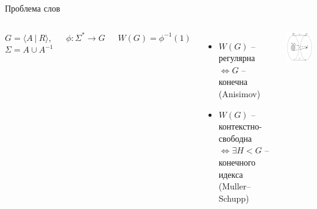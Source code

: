 \documentclass[xcolor=table]{beamer}
\begin{document}
\begin{frame}[noframenumbering]{Проблема слов}
    \begin{columns}[onlytextwidth,T]
        \column{\dimexpr\linewidth-60mm-5mm}
        $G = \langle A~|~R \rangle$, $\Sigma = A \cup A^{-1}$
        
        $\phi : \Sigma^* \to G$
        
        $W(G) = \phi^{-1}(1)$
        \newline
        \newline
        \begin{itemize}
            \item $W(G)$ -- регулярна $\iff G$ -- конечна (Anisimov)
            \item $W(G)$ -- контекстно-свободна $\iff \exists H < G$ -- конечного идекса (Muller–Schupp)
        \end{itemize}
        
        \column{60mm}
        \includegraphics[width=60mm]{pictures/3.png}
    \end{columns}
\end{frame}
\end{document}
